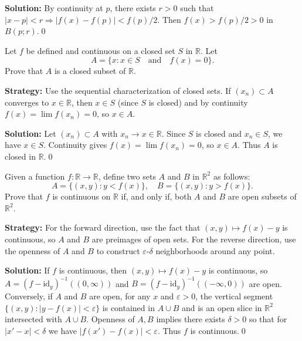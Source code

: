 \bigskip\noindent\textbf{Solution:}
By continuity at $p$, there exists $r>0$ such that $|x-p|<r\Rightarrow |f(x)-f(p)|<f(p)/2$. Then $f(x)>f(p)/2>0$ in $B(p;r)$.\qed



\begin{problembox}
Let \( f \) be defined and continuous on a closed set \( S \) in \( \mathbb{R} \). Let
\[A = \{x : x \in S \quad \text{and} \quad f(x) = 0\}.\]
Prove that \( A \) is a closed subset of \( \mathbb{R} \).
\end{problembox}

\noindent\textbf{Strategy:} Use the sequential characterization of closed sets. If $(x_n) \subset A$ converges to $x \in \mathbb{R}$, then $x \in S$ (since $S$ is closed) and by continuity $f(x) = \lim f(x_n) = 0$, so $x \in A$.

\bigskip\noindent\textbf{Solution:}
Let $(x_n)\subset A$ with $x_n\to x\in\mathbb{R}$. Since $S$ is closed and $x_n\in S$, we have $x\in S$. Continuity gives $f(x)=\lim f(x_n)=0$, so $x\in A$. Thus $A$ is closed in $\mathbb{R}$.\qed



\begin{problembox}
Given a function \( f: \mathbb{R} \to \mathbb{R} \), define two sets \( A \) and \( B \) in \( \mathbb{R}^2 \) as follows:
\[A = \{(x, y) : y < f(x)\}, \quad B = \{(x, y) : y > f(x)\}.\]
Prove that \( f \) is continuous on \( \mathbb{R} \) if, and only if, both \( A \) and \( B \) are open subsets of \( \mathbb{R}^2 \).
\end{problembox}

\noindent\textbf{Strategy:} For the forward direction, use the fact that $(x,y) \mapsto f(x) - y$ is continuous, so $A$ and $B$ are preimages of open sets. For the reverse direction, use the openness of $A$ and $B$ to construct $\varepsilon$-$\delta$ neighborhoods around any point.

\bigskip\noindent\textbf{Solution:}
If $f$ is continuous, then $(x,y)\mapsto f(x)-y$ is continuous, so $A=(f-\mathrm{id}_y)^{-1}((0,\infty))$ and $B=(f-\mathrm{id}_y)^{-1}(({-}\infty,0))$ are open. Conversely, if $A$ and $B$ are open, for any $x$ and $\varepsilon>0$, the vertical segment $\{(x,y):|y-f(x)|<\varepsilon\}$ is contained in $A\cup B$ and is an open slice in $\mathbb{R}^2$ intersected with $A\cup B$. Openness of $A,B$ implies there exists $\delta>0$ so that for $|x'-x|<\delta$ we have $|f(x')-f(x)|<\varepsilon$. Thus $f$ is continuous.\qed



